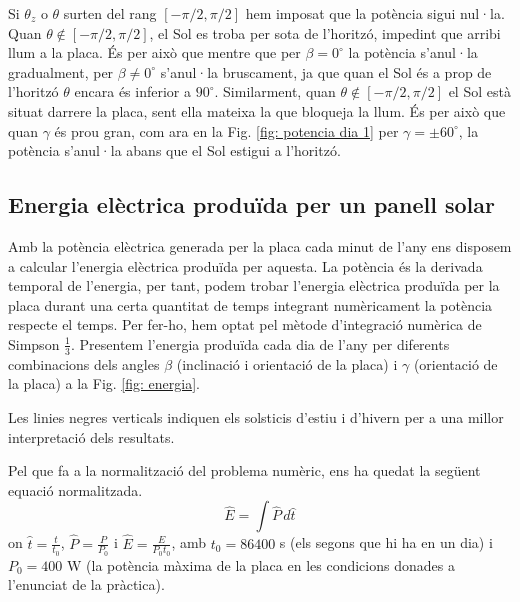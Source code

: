 \documentclass[11pt]{article}
\begin{document}
Si $\theta_z$ o $\theta$ surten del rang $[-\pi/2,\pi/2]$ hem imposat que la potència sigui nul·la. Quan $\theta \notin [-\pi/2,\pi/2]$, el Sol es troba per sota de l'horitzó, impedint que arribi llum a la placa. És per això que mentre que per $\beta = 0^{\circ}$ la potència s'anul·la gradualment, per $\beta \neq 0^{\circ}$ s'anul·la bruscament, ja que quan el Sol és a prop de l’horitzó $\theta$ encara és inferior a $90^{\circ}$. Similarment, quan $\theta \notin [-\pi/2,\pi/2]$ el Sol està situat darrere la placa, sent ella mateixa la que bloqueja la llum. És per això que quan $\gamma$ és prou gran, com ara en la Fig. \ref{fig: potencia dia 1} per $\gamma=\pm60^{\circ}$, la potència s'anul·la abans que el Sol estigui a l'horitzó.

\subsection{Energia elèctrica produïda per un panell solar}
Amb la potència elèctrica generada per la placa cada minut de l'any ens disposem a calcular l'energia elèctrica produïda per aquesta. La potència és la derivada temporal de l'energia, per tant, podem trobar l'energia elèctrica produïda per la placa durant una certa quantitat de temps integrant numèricament la potència respecte el temps. Per fer-ho, hem optat pel mètode d'integració numèrica de Simpson $\frac{1}{3}$. Presentem l'energia produïda cada dia de l'any per diferents combinacions dels angles $\beta$ (inclinació i orientació de la placa) i $\gamma$ (orientació de la placa) a la Fig. \ref{fig: energia}.



Les linies negres verticals indiquen els solsticis d'estiu i d'hivern per a una millor interpretació dels resultats.

Pel que fa a la normalització del problema numèric, ens ha quedat la següent equació normalitzada.
\begin{equation}
    \hat{E} = \int \hat{P} \, d\hat{t}
    \label{energia}
\end{equation}
on $\hat{t}=\frac{t}{t_0}$, $\hat{P}=\frac{P}{P_0}$ i $\hat{E}=\frac{E}{P_0 t_0}$, amb $t_0=86400$ s (els segons que hi ha en un dia) i $P_0=400$ W (la potència màxima de la placa en les condicions donades a l'enunciat de la pràctica). 
\end{document}
